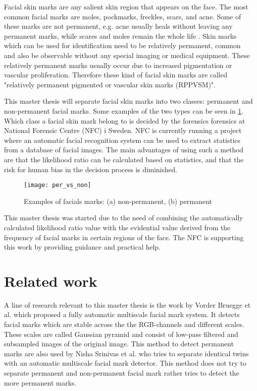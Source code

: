 Facial skin marks are any salient skin region that appears on the face. The most common facial marks are moles, pockmarks, freckles, scars, and acne. Some of these marks are not permanent, e.g. acne usually heals without leaving any permanent marks, while scares and moles remain the whole life \cite{automatic_detector_2015}. Skin marks which can be used for identification need to be relatively permanent, common and also be observable without any special imaging or medical equipment. These relatively permanent marks usually occur due to increased pigmentation or vascular proliferation. Therefore these kind of facial skin marks are called "relatively permanent pigmented or vascular skin marks (RPPVSM)". \cite{statistic_RPPVSM} 

This master thesis will separate facial skin marks into two classes: permanent and non-permanent facial marks. Some examples of the two types can be seen in \cref{fig:per_vs_non}. Which class a facial skin mark belong to is decided by the forensics forensics at National Forensic Centre (NFC) i Sweden. NFC is currently running a project where an automatic facial recognition system can be used to extract statistics from a database of facial images. The main advantages of using such a method are that the likelihood ratio can be calculated based on statistics, and that the risk for human bias in the decision process is diminished.

\FloatBarrier
\begin{figure}[h]
	\centering
	\texttt{[image: per\_vs\_non]}
	\caption{Examples of facials marks: (a) non-permanent, (b) permanent \label{fig:per_vs_non}}
\end{figure}
\FloatBarrier

This master thesis was started due to the need of combining the automatically calculated likelihood ratio value with the evidential value derived from the frequency of facial marks in certain regions of the face. The NFC is supporting this work by providing guidance and practical help.

\section{Related work}

A line of research relevant to this master thesis is the work by Vorder Bruegge et al. \cite{automatic_detector_2015} which proposed a fully automatic multiscale facial mark system. It detects facial marks which are stable across the the RGB-channels and different scales. These scales are called Gaussian pyramid and consist of low-pass filtered and subsampled images of the original image. This method to detect permanent marks are also used by Nisha Srinivas et al. \cite{twins} who tries to separate identical twins with an automatic multiscale facial mark detector. This method does not try to separate permanent and non-permanent facial mark rather tries to detect the more permanent marks.  

